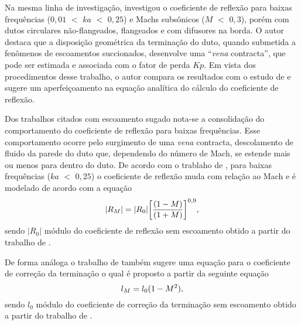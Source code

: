 Na mesma linha de investigação,  investigou o coeficiente de reflexão para baixas frequências ($0,01$ $<$ $ka$ $<$ $0,25$) e Machs subsônicos ($M$ $<$ $0,3$), porém com dutos circulares não-flangeados, flangeados e com difusores na borda. O autor destaca que a disposição geométrica da terminação do duto, quando submetida a fenômenos de escoamentos succionados, desenvolve uma ``\textit{vena} contracta'', que pode ser estimada e associada com o fator de perda $Kp$. Em vista dos procedimentos desse trabalho, o autor compara os resultados com o estudo de  e sugere um aperfeiçoamento na equação analítica do cálculo do coeficiente de reflexão.

Dos trabalhos citados com escoamento sugado nota-se a consolidação do comportamento do coeficiente de reflexão para baixas frequências. Esse comportamento ocorre pelo surgimento de uma \textit{vena} contracta, descolamento de fluido da parede do duto que, dependendo do número de Mach, se estende mais ou menos para dentro do duto. De acordo com o trablaho de , para baixas frequências ($ka$ $<$ $0,25$) o coeficiente de reflexão muda com relação ao Mach e é modelado de acordo com a equação
    \begin{equation}
        |R_{M}|\simbolo{$R_{M}$}{Coeficiente de reflexão em relação ao Mach} = |R_{0}|\bigg[\frac{(1 - M)}{(1 + M)}\bigg]^{0,9},
        \label{eq:R_M}
    \end{equation}
    sendo $|R_{0}|$ módulo do coeficiente de reflexão sem escoamento obtido a partir do trabalho de . 



    De forma análoga o trabalho de  também sugere uma equação para o coeficiente de correção da terminação o qual é proposto a partir da seguinte equação
    \begin{equation}
        l_{M}\simbolo{$l_{M}$}{Coeficiente de correção da terminação em relação ao Mach} = l_{0}(1 - M^{2}),
        \label{eq:l_M}
    \end{equation} 
    sendo $l_{0}$ módulo do coeficiente de correção da terminação sem escoamento obtido a partir do trabalho de .


